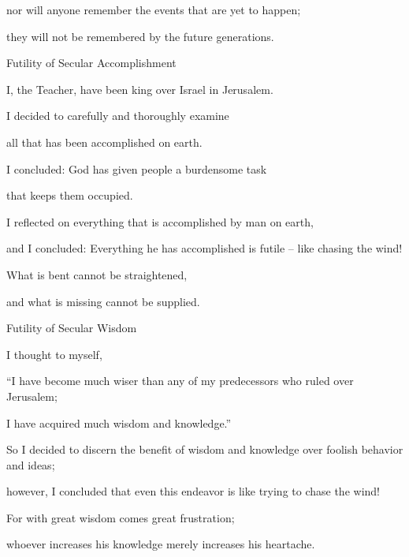{\par }{\Q nor
will anyone remember the events that are yet to happen;
\par }{\Q they will not
be
remembered
by the future generations.
\par }{\SH Futility of Secular Accomplishment
\par }{\Q {}I,
the Teacher,
have been
king
over
Israel
in Jerusalem.
\par }{\Q {}I decided
to carefully
and thoroughly examine
\par }{\Q all
that
has been accomplished
on earth.
\par }{\Q I concluded: God
has given
people
a burdensome
task
\par }{\Q that keeps them occupied.
\par }{\Q {}I reflected
on everything
that is accomplished
by man on earth,
\par }{\Q and I concluded: Everything
he has accomplished is futile –
like chasing
the wind!
\par }{\Q {}What is bent
cannot
be straightened,
\par }{\Q and what is missing
cannot
be supplied.
\par }{\SH Futility of Secular Wisdom
\par }{\Q {}I thought
to myself,
\par }{\Q “I
have
become much
wiser
than any
of my predecessors
who ruled
over
Jerusalem;
\par }{\Q I
have acquired
much
wisdom
and knowledge.”
\par }{\Q {}So I decided
to discern
the benefit of wisdom
and knowledge
over foolish
behavior and ideas;
\par }{\Q however, I concluded
that even
this
endeavor is like trying to chase
the wind!
\par }{\Q {}For
with great
wisdom
comes great
frustration;
\par }{\Q whoever increases
his knowledge
merely increases
his heartache.
\par }{\Q \par }
